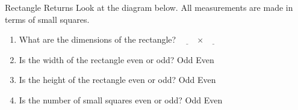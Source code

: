 \documentclass[12pt,letterpaper]{article}
\begin{document}
\begin{problem}{Rectangle Returns}
 Look at the diagram below. All measurements are made in terms of small squares.

 \begin{center}
 \end{center}

 \begin{enumerate}
  \item What are the dimensions of the rectangle? \hfill
  $\underline{\hspace{2em}}\times\underline{\hspace{2em}}$
  \item Is the width of the rectangle even or odd? \hfill Odd \hspace{1em} Even
  \item Is the height of the rectangle even or odd? \hfill Odd \hspace{1em} Even
  \item Is the number of small squares even or odd? \hfill Odd \hspace{1em} Even
 \end{enumerate}
\end{problem}
\end{document}
